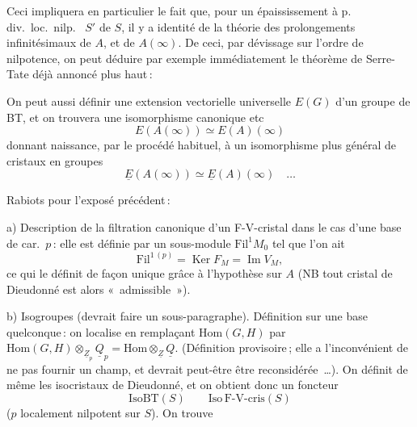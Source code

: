 \documentclass[11pt,a4paper]{article}
\begin{document}
Ceci impliquera en particulier le fait que, pour un  épaississement à p.\,div.\ loc.\ nilp.\  $S'$ de $S$, il y a identité de la théorie des prolongements infinitésimaux de $A$, et de $A(\infty)$. De ceci, par dévissage sur l'ordre de nilpotence, on peut déduire par exemple immédiatement le théorème de Serre-Tate déjà annoncé plus haut\,: 

On peut aussi définir une extension vectorielle universelle $E(G)$ d'un groupe de BT, et on trouvera une isomorphisme canonique etc
\[
  E(A(\infty)) \simeq E(A)(\infty)
\]
donnant naissance, par le procédé habituel, à un isomorphisme plus général de cristaux en groupes
\[
  \underline{E}(A(\infty)) \simeq \underline{E}(A)(\infty) \quad \ldots
\]




Rabiots pour l'exposé précédent\,:

a) Description de la filtration canonique d'un F-V-cristal dans le cas d'une base  de car.\ $p$\,: elle est définie par un sous-module $\mathrm{Fil}^1 M_0$  tel que l'on ait
\[
  \mathrm{Fil}^{1\,(p)} = \operatorname{Ker} F_M = \operatorname{Im} V_M ,
\]
ce qui le définit de façon unique grâce à l'hypothèse sur $A$ (NB tout cristal de Dieudonné est alors «~admissible~»).

b) Isogroupes  (devrait faire un sous-paragraphe). Définition sur une base quelconque\,: on localise  en remplaçant $\mathrm{Hom}(G,H)$ par $\mathrm{Hom}(G,H) \otimes_{\underline{Z}_p} \underline{Q}_p = \mathrm{Hom} \otimes_{\underline{Z}} \underline{Q}$. (Définition provisoire\,; elle  a l'inconvénient de ne pas fournir un champ, et devrait peut-être être reconsidérée~…). On définit de même les isocristaux de Dieudonné, et on obtient donc un foncteur
\[
  \mathrm{IsoBT}(S) \qquad \mathrm{Iso\,F\text{-}V\text{-}cris}(S)
\]
($p$ localement nilpotent sur $S$). On trouve
\end{document}
